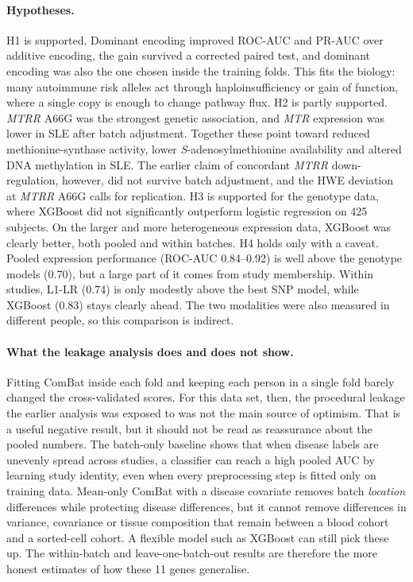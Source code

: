 \documentclass[11pt]{article}
\begin{document}
\paragraph{Hypotheses.} H1 is supported. Dominant encoding improved ROC-AUC and PR-AUC over additive encoding, the gain survived a corrected paired test, and dominant encoding was also the one chosen inside the training folds. This fits the biology: many autoimmune risk alleles act through haploinsufficiency or gain of function, where a single copy is enough to change pathway flux. H2 is partly supported. \textit{MTRR} A66G was the strongest genetic association, and \textit{MTR} expression was lower in SLE after batch adjustment. Together these point toward reduced methionine-synthase activity, lower \textit{S}-adenosylmethionine availability and altered DNA methylation in SLE. The earlier claim of concordant \textit{MTRR} down-regulation, however, did not survive batch adjustment, and the HWE deviation at \textit{MTRR} A66G calls for replication. H3 is supported for the genotype data, where XGBoost did not significantly outperform logistic regression on 425 subjects. On the larger and more heterogeneous expression data, XGBoost was clearly better, both pooled and within batches. H4 holds only with a caveat. Pooled expression performance (ROC-AUC 0.84--0.92) is well above the genotype models (0.70), but a large part of it comes from study membership. Within studies, L1-LR (0.74) is only modestly above the best SNP model, while XGBoost (0.83) stays clearly ahead. The two modalities were also measured in different people, so this comparison is indirect.

\paragraph{What the leakage analysis does and does not show.} Fitting ComBat inside each fold and keeping each person in a single fold barely changed the cross-validated scores. For this data set, then, the procedural leakage the earlier analysis was exposed to was not the main source of optimism. That is a useful negative result, but it should not be read as reassurance about the pooled numbers. The batch-only baseline shows that when disease labels are unevenly spread across studies, a classifier can reach a high pooled AUC by learning study identity, even when every preprocessing step is fitted only on training data. Mean-only ComBat with a disease covariate removes batch \emph{location} differences while protecting disease differences, but it cannot remove differences in variance, covariance or tissue composition that remain between a blood cohort and a sorted-cell cohort. A flexible model such as XGBoost can still pick these up. The within-batch and leave-one-batch-out results are therefore the more honest estimates of how these 11 genes generalise.
\end{document}
